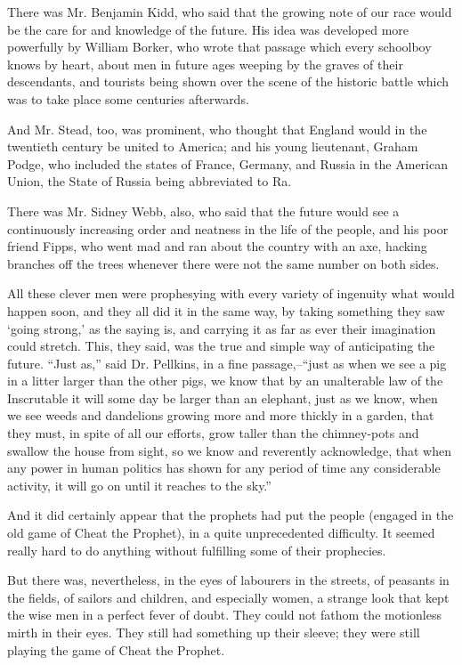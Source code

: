 \documentclass{book}
\begin{document}
There was Mr. Benjamin Kidd, who said that the growing note of our race would be the care for and knowledge of the future. His idea was developed more powerfully by William Borker, who wrote that passage which every schoolboy knows by heart, about men in future ages weeping by the graves of their descendants, and tourists being shown over the scene of the historic battle which was to take place some centuries afterwards.

And Mr. Stead, too, was prominent, who thought that England would in the twentieth century be united to America; and his young lieutenant, Graham Podge, who included the states of France, Germany, and Russia in the American Union, the State of Russia being abbreviated to Ra.

There was Mr. Sidney Webb, also, who said that the future would see a continuously increasing order and neatness in the life of the people, and his poor friend Fipps, who went mad and ran about the country with an axe, hacking branches off the trees whenever there were not the same number on both sides.

All these clever men were prophesying with every variety of ingenuity what would happen soon, and they all did it in the same way, by taking something they saw ‘going strong,’ as the saying is, and carrying it as far as ever their imagination could stretch. This, they said, was the true and simple way of anticipating the future. “Just as,” said Dr. Pellkins, in a fine passage,–“just as when we see a pig in a litter larger than the other pigs, we know that by an unalterable law of the Inscrutable it will some day be larger than an elephant, just as we know, when we see weeds and dandelions growing more and more thickly in a garden, that they must, in spite of all our efforts, grow taller than the chimney-pots and swallow the house from sight, so we know and reverently acknowledge, that when any power in human politics has shown for any period of time any considerable activity, it will go on until it reaches to the sky.”

And it did certainly appear that the prophets had put the people (engaged in the old game of Cheat the Prophet), in a quite unprecedented difficulty. It seemed really hard to do anything without fulfilling some of their prophecies.

But there was, nevertheless, in the eyes of labourers in the streets, of peasants in the fields, of sailors and children, and especially women, a strange look that kept the wise men in a perfect fever of doubt. They could not fathom the motionless mirth in their eyes. They still had something up their sleeve; they were still playing the game of Cheat the Prophet.
\end{document}
